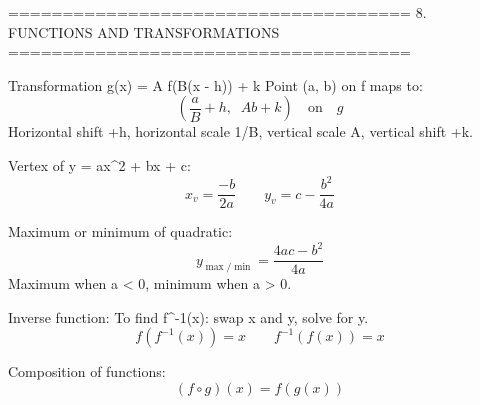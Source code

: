 =====================================
8. FUNCTIONS AND TRANSFORMATIONS
=====================================

Transformation g(x) = A f(B(x - h)) + k
Point (a, b) on f maps to:
$$\left( \frac{a}{B} + h, \;\; Ab + k \right) \quad \text{on} \quad g$$
Horizontal shift +h, horizontal scale 1/B, vertical scale A, vertical shift +k.

Vertex of y = ax^2 + bx + c:
$$x_v = \frac{-b}{2a} \qquad y_v = c - \frac{b^2}{4a}$$

Maximum or minimum of quadratic:
$$y_{\max/\min} = \frac{4ac - b^2}{4a}$$
Maximum when a < 0, minimum when a > 0.

Inverse function:
To find f^{-1}(x): swap x and y, solve for y.
$$f\left(f^{-1}(x)\right) = x \qquad f^{-1}\left(f(x)\right) = x$$

Composition of functions:
$$(f \circ g)(x) = f(g(x))$$
